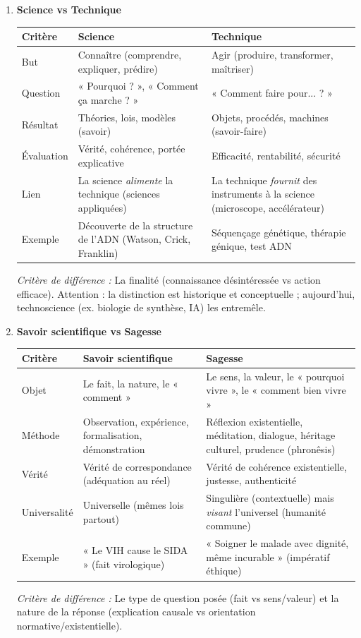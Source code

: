 \documentclass[11pt]{article}
\newcommand{\cle}[1]{{\popxbold\color{popdark}#1}}
\begin{document}
\begin{corrige}
\begin{enumerate}
\item \textbf{Science vs Technique}
\begin{center}
\begin{tabularx}{\linewidth}{|l|X|X|}\hline
\rowcolor{popblueL} \textbf{Critère} & \textbf{Science} & \textbf{Technique} \\ \hline
But & \cle{Connaître} (comprendre, expliquer, prédire) & \cle{Agir} (produire, transformer, maîtriser) \\ \hline
Question & « Pourquoi ? », « Comment ça marche ? » & « Comment faire pour... ? » \\ \hline
Résultat & Théories, lois, modèles (savoir) & Objets, procédés, machines (savoir-faire) \\ \hline
Évaluation & Vérité, cohérence, portée explicative & Efficacité, rentabilité, sécurité \\ \hline
Lien & La science \emph{alimente} la technique (sciences appliquées) & La technique \emph{fournit} des instruments à la science (microscope, accélérateur) \\ \hline
Exemple & Découverte de la structure de l'ADN (Watson, Crick, Franklin) & Séquençage génétique, thérapie génique, test ADN \\ \hline
\end{tabularx}
\end{center}
\emph{Critère de différence :} La \cle{finalité} (connaissance désintéressée vs action efficace). Attention : la distinction est historique et conceptuelle ; aujourd'hui, \cle{technoscience} (ex. biologie de synthèse, IA) les entremêle.

\item \textbf{Savoir scientifique vs Sagesse}
\begin{center}
\begin{tabularx}{\linewidth}{|l|X|X|}\hline
\rowcolor{popblueL} \textbf{Critère} & \textbf{Savoir scientifique} & \textbf{Sagesse} \\ \hline
Objet & Le \cle{fait}, la nature, le « comment » & Le \cle{sens}, la valeur, le « pourquoi vivre », le « comment bien vivre » \\ \hline
Méthode & Observation, expérience, formalisation, démonstration & Réflexion existentielle, méditation, dialogue, héritage culturel, prudence (phronêsis) \\ \hline
Vérité & Vérité de correspondance (adéquation au réel) & Vérité de cohérence existentielle, justesse, authenticité \\ \hline
Universalité & Universelle (mêmes lois partout) & Singulière (contextuelle) mais \emph{visant} l'universel (humanité commune) \\ \hline
Exemple & « Le VIH cause le SIDA » (fait virologique) & « Soigner le malade avec dignité, même incurable » (impératif éthique) \\ \hline
\end{tabularx}
\end{center}
\emph{Critère de différence :} Le \cle{type de question} posée (fait vs sens/valeur) et la \cle{nature de la réponse} (explication causale vs orientation normative/existentielle).


\end{enumerate}
\end{corrige}
\end{document}
